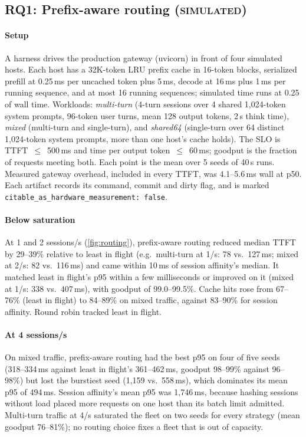 \documentclass[conference,letterpaper]{IEEEtran}
\newcommand{\code}[1]{\texttt{\small #1}}
\newcommand{\ev}[1]{{\normalfont\textsc{#1}}}
\newcommand{\Simulated}{\ev{simulated}}
\begin{document}
\subsection{RQ1: Prefix-aware routing \normalfont(\Simulated{})}
\label{sec:eval-routing}

\paragraph*{Setup}
A harness drives the production gateway (uvicorn) in front of four simulated hosts. Each host
has a 32K-token LRU prefix cache in 16-token blocks, serialized prefill at 0.25\,ms per uncached
token plus 5\,ms, decode at 16\,ms plus 1\,ms per running sequence, and at most 16 running
sequences; simulated time runs at 0.25 of wall time. Workloads: \emph{multi-turn} (4-turn
sessions over 4 shared 1{,}024-token system prompts, 96-token user turns, mean 128 output
tokens, 2\,s think time), \emph{mixed} (multi-turn and single-turn), and \emph{shared64}
(single-turn over 64 distinct 1{,}024-token system prompts, more than one host's cache holds).
The SLO is TTFT~$\le$~500\,ms and time per output token~$\le$~60\,ms; goodput is the fraction of
requests meeting both. Each point is the mean over 5 seeds of 40\,s runs. Measured gateway
overhead, included in every TTFT, was 4.1--5.6\,ms wall at p50. Each artifact records its
command, commit and dirty flag, and is marked \code{citable\_as\_hardware\_measurement: false}.


\paragraph*{Below saturation}
At 1 and 2 sessions/s (\cref{fig:routing}), prefix-aware routing reduced median TTFT by
29--39\% relative to least in flight (e.g.\ multi-turn at 1/s: 78 vs.\ 127\,ms; mixed at 2/s:
82 vs.\ 116\,ms) and came within 10\,ms of session affinity's median. It matched least in
flight's p95 within a few milliseconds or improved on it (mixed at 1/s: 338 vs.\ 407\,ms), with
goodput of 99.0--99.5\%. Cache hits rose from 67--76\% (least in flight) to 84--89\% on mixed
traffic, against 83--90\% for session affinity. Round robin tracked least in flight.

\paragraph*{At 4 sessions/s}
On mixed traffic, prefix-aware routing had the best p95 on four of five seeds (318--334\,ms
against least in flight's 361--462\,ms, goodput 98--99\% against 96--98\%) but lost the
burstiest seed (1{,}159 vs.\ 558\,ms), which dominates its mean p95 of 494\,ms. Session
affinity's mean p95 was 1{,}746\,ms, because hashing sessions without load placed more requests
on one host than its batch limit admitted. Multi-turn traffic at 4/s
saturated the fleet on two seeds for every strategy (mean goodput 76--81\%); no routing choice
fixes a fleet that is out of capacity.
\end{document}
